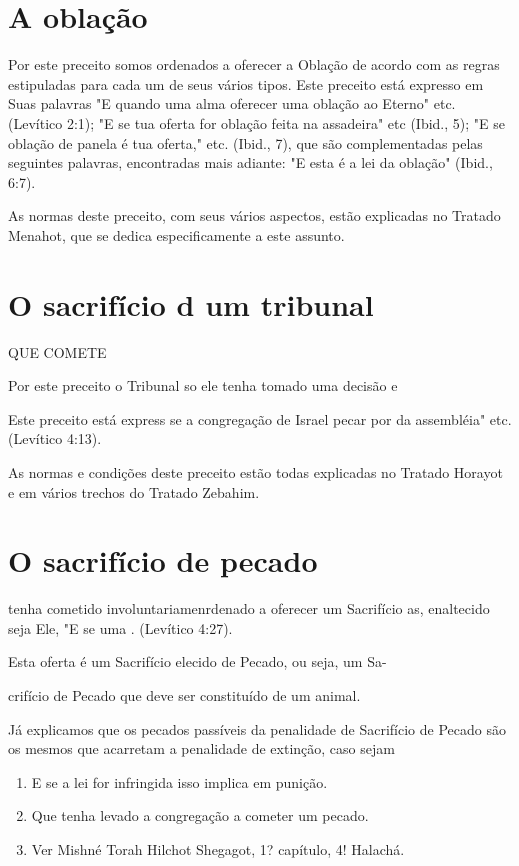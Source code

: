 \section{A oblação}

Por este preceito somos ordenados a oferecer a Oblação de acordo com as
regras estipuladas para cada um de seus vários tipos. Este preceito está
expresso em Suas palavras "E quando uma alma oferecer uma oblação ao
Eter­no" etc. (Levítico 2:1); "E se tua oferta for oblação feita na
assadeira" etc (Ibid., 5); "E se oblação de panela é tua oferta," etc.
(Ibid., 7), que são complementa­das pelas seguintes palavras,
encontradas mais adiante: "E esta é a lei da obla­ção" (Ibid., 6:7).

As normas deste preceito, com seus vários aspectos, estão explica­das no
Tratado Menahot, que se dedica especificamente a este assunto.

\section{O sacrifício d um tribunal}


QUE COMETE


Por este preceito o Tribunal so ele tenha tomado uma decisão e

Este preceito está express se a congregação de Israel pecar por da
assembléia" etc. (Levítico 4:13).

As normas e condições deste preceito estão todas explicadas no Tra­tado
Horayot e em vários trechos do Tratado Zebahim.

\section{O sacrifício de pecado}


tenha cometido involuntariamen­rdenado a oferecer um Sacrifício as,
enaltecido seja Ele, "E se uma . (Levítico 4:27).


Esta oferta é um Sacrifício elecido de Pecado, ou seja, um Sa-

crifício de Pecado que deve ser constituído de um animal.

Já explicamos que os pecados passíveis da penalidade de Sacrifício de
Pecado são os mesmos que acarretam a penalidade de extinção, caso sejam


\begin{enumerate}
\def\labelenumi{\arabic{enumi}.}
\setcounter{enumi}{84}
\item
 
 E se a lei for infringida isso implica em punição.
 
\item
 
 Que tenha levado a congregação a cometer um pecado.
 
\item
 
 Ver Mishné Torah Hilchot Shegagot, 1? capítulo, 4! Halachá.
 
\end{enumerate}




